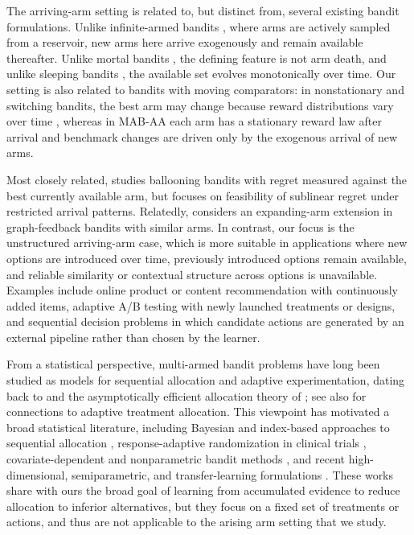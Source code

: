 \documentclass[11pt]{article}
\begin{document}
The arriving-arm setting is related to, but distinct from, several existing bandit formulations. Unlike infinite-armed bandits \parencite{10.1214/aos/1069362389}, where arms are actively sampled from a reservoir, new arms here arrive exogenously and remain available thereafter. Unlike mortal bandits \parencite{NIPS2008_788d9869}, the defining feature is not arm death, and unlike sleeping bandits \parencite{10.1007/s10994-010-5178-7}, the available set evolves monotonically over time. Our setting is also related to bandits with moving comparators: in nonstationary and switching bandits, the best arm may change because reward distributions vary over time \parencite{Besbes2014,Auer2019ADSWITCH}, whereas in MAB-AA each arm has a stationary reward law after arrival and benchmark changes are driven only by the exogenous arrival of new arms. 

Most closely related, \textcite{ghalme2021ballooning} studies ballooning bandits with regret measured against the best currently available arm, but focuses on feasibility of sublinear regret under restricted arrival patterns. Relatedly, \textcite{qi2025graphfeedback} considers an expanding-arm extension in graph-feedback bandits with similar arms. In contrast, our focus is the unstructured arriving-arm case, which is more suitable in applications where new options are introduced over time, previously introduced options remain available, and reliable similarity or contextual structure across options is unavailable. Examples include online product or content recommendation with continuously added items, adaptive A/B testing with newly launched treatments or designs, and sequential decision problems in which candidate actions are generated by an external pipeline rather than chosen by the learner.

From a statistical perspective, multi-armed bandit problems have long been studied as models for sequential allocation and adaptive experimentation, dating back to \textcite{Robbins1952} and the asymptotically efficient allocation theory of \textcite{LAI19854}; see also \textcite{Lai1987} for connections to adaptive treatment allocation. This viewpoint has motivated a broad statistical literature, including Bayesian and index-based approaches to sequential allocation \parencite{Gittins1979,BerryFristedt1985}, response-adaptive randomization in clinical trials \parencite{Zelen1969,WeiDurham1978,VillarBowdenWason2015,WilliamsonVillar2020,AzizKaufmannRiviere2021}, covariate-dependent and nonparametric bandit methods \parencite{Woodroofe1979,YangZhu2002,RigolletZeevi2010,PerchetRigollet2013}, and recent high-dimensional, semiparametric, and transfer-learning formulations \parencite{QianYang2016,QianIngLiu2023,CaiCaiLi2024}. These works share with ours the broad goal of learning from accumulated evidence to reduce allocation to inferior alternatives, but they focus on a fixed set of treatments or actions, and thus are not applicable to the arising arm setting that we study.
\end{document}
